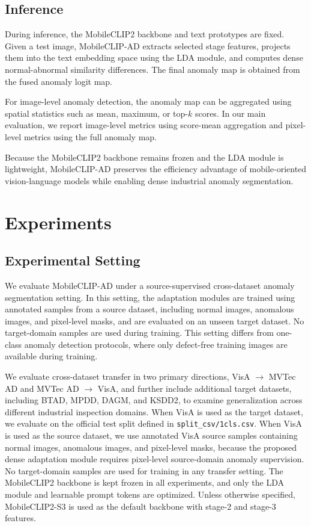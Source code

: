 \documentclass[10pt]{article}
\begin{document}
\subsection{Inference}

During inference, the MobileCLIP2 backbone and text prototypes are fixed. Given a test image, MobileCLIP-AD extracts selected stage features, projects them into the text embedding space using the LDA module, and computes dense normal-abnormal similarity differences. The final anomaly map is obtained from the fused anomaly logit map.

For image-level anomaly detection, the anomaly map can be aggregated using spatial statistics such as mean, maximum, or top-$k$ scores. In our main evaluation, we report image-level metrics using score-mean aggregation and pixel-level metrics using the full anomaly map.

Because the MobileCLIP2 backbone remains frozen and the LDA module is lightweight, MobileCLIP-AD preserves the efficiency advantage of mobile-oriented vision-language models while enabling dense industrial anomaly segmentation.


\section{Experiments}


\subsection{Experimental Setting}

We evaluate MobileCLIP-AD under a source-supervised cross-dataset anomaly segmentation setting. In this setting, the adaptation modules are trained using annotated samples from a source dataset, including normal images, anomalous images, and pixel-level masks, and are evaluated on an unseen target dataset. No target-domain samples are used during training. This setting differs from one-class anomaly detection protocols, where only defect-free training images are available during training.

We evaluate cross-dataset transfer in two primary directions, VisA $\rightarrow$ MVTec AD and MVTec AD $\rightarrow$ VisA, and further include additional target datasets, including BTAD, MPDD, DAGM, and KSDD2, to examine generalization across different industrial inspection domains. When VisA is used as the target dataset, we evaluate on the official test split defined in \texttt{split\_csv/1cls.csv}. When VisA is used as the source dataset, we use annotated VisA source samples containing normal images, anomalous images, and pixel-level masks, because the proposed dense adaptation module requires pixel-level source-domain anomaly supervision. No target-domain samples are used for training in any transfer setting. The MobileCLIP2 backbone is kept frozen in all experiments, and only the LDA module and learnable prompt tokens are optimized. Unless otherwise specified, MobileCLIP2-S3 is used as the default backbone with stage-2 and stage-3 features.
\end{document}
